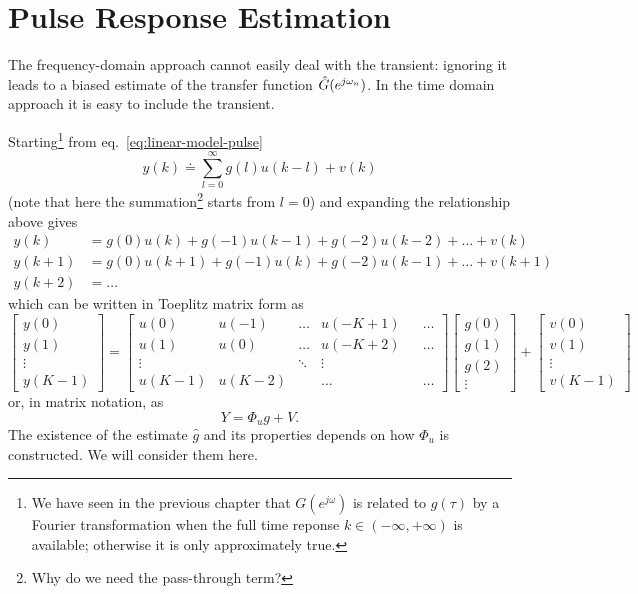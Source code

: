 \chapter{Pulse Response Estimation}
\label{chap:time-domain}


The frequency-domain approach cannot easily deal with the transient: ignoring it leads to a biased estimate of the transfer function $\hat{G}(e^{j\omega_n})$. In the time domain approach it is easy to include the transient.

Starting\footnote{We have seen in the previous chapter that $G(e^{j\omega})$ is related to $g(\tau)$ by a Fourier transformation when the full time reponse $k\in (-\infty,+\infty)$ is available; otherwise it is only approximately true.} from eq.~\eqref{eq:linear-model-pulse}
\begin{equation*}
  y(k) \doteq \sum_{l=0}^\infty g(l)u(k-l) + v(k)
\end{equation*}
(note that here the summation\footnote{Why do we need the pass-through term?} starts from $l=0$) and expanding the relationship above gives
\begin{align*}
  y(k) &= g(0)u(k) + g(-1)u(k-1) + g(-2)u(k-2) + \ldots + v(k) \\
  y(k+1) &= g(0)u(k+1) + g(-1)u(k) + g(-2)u(k-1) + \ldots + v(k+1) \\
  y(k+2) &= \ldots
\end{align*}
which can be written in Toeplitz matrix form as
\begin{equation}
  \label{eq:TD-response-estimation-matrix}
  \begin{bmatrix}
    y(0) \\ y(1) \\ \vdots \\ y(K-1)
  \end{bmatrix} =
  \begin{bmatrix}
    u(0) & u(-1) & \ldots & u(-K+1) && \ldots \\
    u(1) & u(0) & \ldots & u(-K+2) && \ldots \\
    \vdots & & \ddots & \vdots \\
    u(K-1) & u(K-2) & & \ldots & & \hdots
  \end{bmatrix}
  \begin{bmatrix}
    g(0) \\ g(1) \\ g(2) \\ \vdots
  \end{bmatrix} +
  \begin{bmatrix}
    v(0) \\ v(1) \\ \vdots \\ v(K-1)
  \end{bmatrix}
\end{equation}
or, in matrix notation, as
\begin{equation}
  \label{eq:TD-response-estimation}
  Y = \Phi_ug + V.
\end{equation}
The existence of the estimate $\hat{g}$ and its properties depends on how $\Phi_u$ is constructed. We will consider them here.

